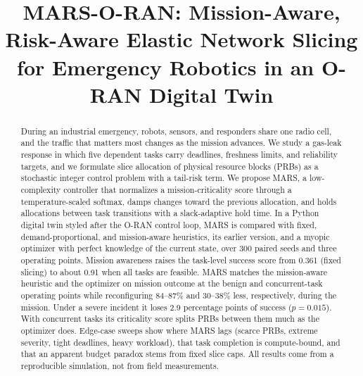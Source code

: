 \documentclass[conference]{IEEEtran}
\begin{document}
\title{MARS-O-RAN: Mission-Aware, Risk-Aware Elastic Network Slicing for Emergency Robotics in an O-RAN Digital Twin}

\author{
\and
{}
\and
{}
\and
{}
}

\maketitle

\begin{abstract}
During an industrial emergency, robots, sensors, and responders share one radio cell, and the traffic that matters most changes as the mission advances. We study a gas-leak response in which five dependent tasks carry deadlines, freshness limits, and reliability targets, and we formulate slice allocation of physical resource blocks (PRBs) as a stochastic integer control problem with a tail-risk term. We propose MARS, a low-complexity controller that normalizes a mission-criticality score through a temperature-scaled softmax, damps changes toward the previous allocation, and holds allocations between task transitions with a slack-adaptive hold time. In a Python digital twin styled after the O-RAN control loop, MARS is compared with fixed, demand-proportional, and mission-aware heuristics, its earlier version, and a myopic optimizer with perfect knowledge of the current state, over 300 paired seeds and three operating points. Mission awareness raises the task-level success score from 0.361 (fixed slicing) to about 0.91 when all tasks are feasible. MARS matches the mission-aware heuristic and the optimizer on mission outcome at the benign and concurrent-task operating points while reconfiguring 84--87\% and 30--38\% less, respectively, during the mission. Under a severe incident it loses 2.9 percentage points of success ($p=0.015$). With concurrent tasks its criticality score splits PRBs between them much as the optimizer does. Edge-case sweeps show where MARS lags (scarce PRBs, extreme severity, tight deadlines, heavy workload), that task completion is compute-bound, and that an apparent budget paradox stems from fixed slice caps. All results come from a reproducible simulation, not from field measurements.
\end{abstract}
\end{document}
